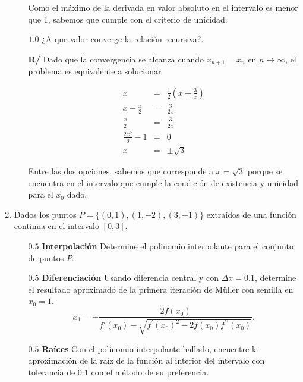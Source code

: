 \documentclass[12pt]{article}
\begin{document}
\begin{enumerate}[leftmargin=*,widest=9]
\begin{itemize}
    Como el máximo de la derivada en valor absoluto en el intervalo es menor que 1, sabemos que cumple con el criterio de unicidad.

    \item[$1.0$] ¿A que valor converge la relación recursiva?.

    \textbf{R/} Dado que la convergencia se alcanza cuando \(x_{n+1}=x_{n}\) en \(n \rightarrow \infty \), el problema es equivalente a solucionar

    \begin{eqnarray*}
    x & = & \frac{1}{2} \left(x + \frac{3}{x} \right) \\
    x - \frac{x}{2} & = & \frac{3}{2x} \\
    \frac{x}{2} & = & \frac{3}{2x} \\
    \frac{2x^2}{6} - 1 & = & 0 \\
    x & = & \pm \sqrt{3}
    \end{eqnarray*}

    Entre las dos opciones, sabemos que corresponde a \(x=\sqrt{3}\) porque se encuentra en el intervalo que cumple la condición de existencia y unicidad para el \(x_0\) dado.

    \end{itemize}

 \item Dados los puntos $P=\lbrace (0, 1), (1, {-2}), (3, {-1}) \rbrace$ extraídos de una función continua en el intervalo $\left[0, 3\right]$.
    \begin{itemize}
    \item[$0.5$] \textbf{Interpolación} Determine el polinomio interpolante para el conjunto de puntos $P$.
    \vspace{5cm}
    \item[$0.5$] \textbf{Diferenciación} Usando diferencia central y con $\Delta x = 0.1$, determine el resultado aproximado de la primera iteración de M\"uller con semilla en $x_0=1$.
    \[
    x_1 = -\frac{2f(x_0)}{f\prime(x_0)-\sqrt{f^\prime{(x_0)}^2 - 2f(x_0)f^{\prime\prime}(x_0)}}.
    \]
    \vspace{4cm}
    \item[$0.5$] \textbf{Raíces} Con el polinomio interpolante hallado, encuentre la aproximación de la raíz de la función al interior del intervalo con tolerancia de $0.1$ con el método de su preferencia.
    \vspace{5cm}
    \end{itemize}



\end{enumerate}
\end{document}
